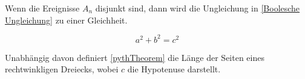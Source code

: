 

Wenn die Ereignisse $A_n$ disjunkt sind, dann wird die Ungleichung
in \autoref{Boolesche Ungleichung} zu einer Gleichheit. 

\begin{equation}\label{pythTheorem}
  a^2+b^2=c^2
\end{equation}

Unabhängig davon definiert \autoref{pythTheorem} die Länge der Seiten eines rechtwinkligen Dreiecks, wobei $c$ die Hypotenuse darstellt. 
